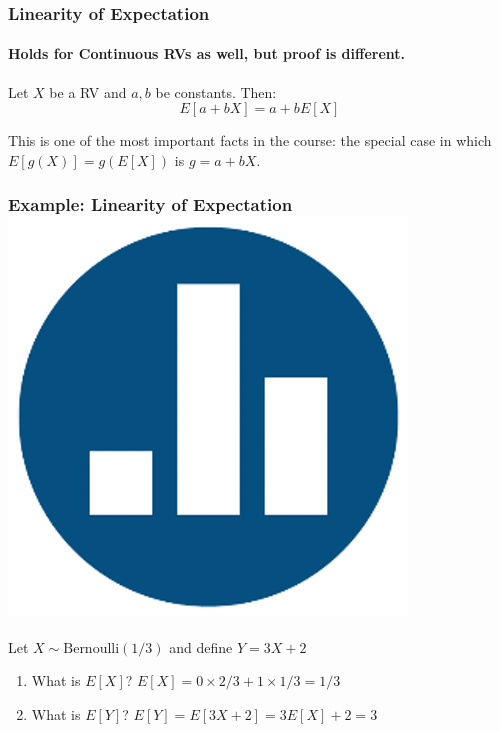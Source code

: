 \documentclass[handout]{beamer}
\begin{document}
\begin{frame}
\frametitle{Linearity of Expectation}
\framesubtitle{Holds for Continuous RVs as well, but proof is different.}
Let $X$ be a RV and $a,b$ be constants. Then:
	$$E[a + bX] = a + bE[X]$$
\vspace{2em}
\begin{alertblock}{This is one of the most important facts in the course: the special case in which $E[g(X)] = g(E[X])$ is $g = a+bX$.}
\end{alertblock}
\end{frame}
\begin{frame}
\frametitle{Example: Linearity of Expectation \hfill \includegraphics[scale = 0.05]{./images/clicker} }
Let $X \sim \mbox{Bernoulli}(1/3)$ and define $Y = 3X + 2$
\vspace{1em}

\begin{enumerate}
  \item What is $E[X]$? \pause \hspace{2em} \alert{$E[X] = 0 \times 2/3 + 1 \times 1/3 = 1/3$} \pause
  \item What is $E[Y]$? \pause \hspace{2em} \alert{$E[Y] = E[3X + 2] = 3E[X] + 2 = 3$}
\end{enumerate}
\end{frame}
\end{document}
